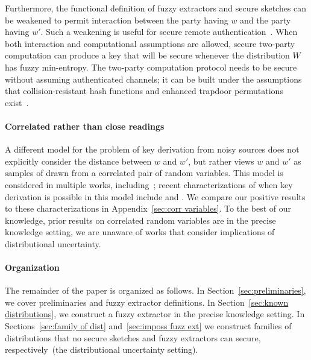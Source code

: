 \documentclass[11pt]{article}
\newcommand{\secref}[1]{\mbox{Section~\ref{#1}}}
\newcommand{\apref}[1]{\mbox{Appendix~\ref{#1}}}
\newcommand{\Hfuzz}{\mathrm{H}^{\mathtt{fuzz}}_{t,\infty}}
\begin{document}
Furthermore, the functional definition of fuzzy extractors and secure sketches can be weakened to permit interaction between the party having $w$ and the party having $w'$. Such a weakening is useful for secure remote authentication~\cite{Boyen05secureremote}. When both interaction and computational assumptions are allowed, secure two-party computation can produce a key that will be secure whenever the distribution $W$ has fuzzy min-entropy.  The two-party computation protocol needs to be secure without assuming authenticated channels; it can be built under the assumptions that collision-resistant hash functions and enhanced trapdoor permutations exist~\cite{DBLP:journals/joc/BarakCLPR11}.

\paragraph{Correlated rather than close readings}
A different model for the problem of key derivation from noisy sources does not explicitly consider the distance between $w$ and $w'$, but rather views $w$ and $w'$ as samples of drawn from a correlated pair of random variables.   This model is considered in multiple works, including~\cite{wyner1975wire,DBLP:journals/tit/CsiszarK78,DBLP:journals/tit/AhlswedeC93,DBLP:journals/tit/Maurer93}; recent characterizations of when key derivation is possible in this model include \cite{DBLP:conf/asiacrypt/RennerW05} and \cite{DBLP:journals/corr/TyagiW14}.  We compare our positive results to these characterizations in \apref{sec:corr variables}.  To the best of our knowledge, prior results on correlated random variables are in the precise knowledge setting, we are unaware of works that consider implications of distributional uncertainty.


\paragraph{Organization} The remainder of the paper is organized as follows.  In \secref{sec:preliminaries}, we cover preliminaries and fuzzy extractor definitions.  In \secref{sec:known distributions}, we construct a fuzzy extractor in the precise knowledge setting.  In Sections~\ref{sec:family of dist} and~\ref{sec:imposs fuzz ext} we construct families of distributions that no secure sketches and fuzzy extractors can secure, respectively~(the distributional uncertainty setting).
\end{document}
